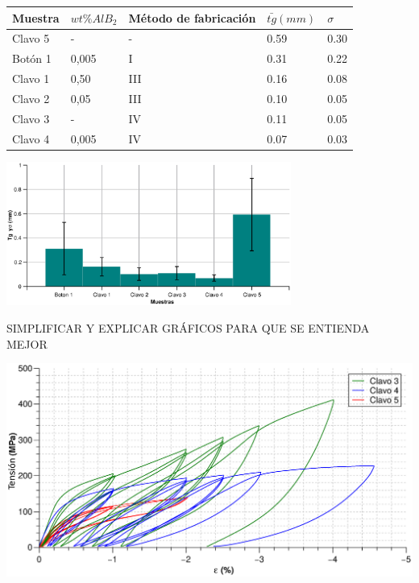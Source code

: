 \documentclass[usenames,dvipsnames]{beamer}
\begin{document}
\begin{frame}
 
 
 
\begin{table} 
\tiny
\begin{center} 
\begin{tabular}{@{}lllll@{}} \toprule
Muestra & $wt \% AlB_2$ & Método de fabricación & $\bar{tg} (mm)$ & $\sigma$ \\ \midrule
 Clavo 5 &  -     & -   & 0.59  & 0.30   \\
 Botón 1    &  0,005 & I   & 0.31 & 0.22  \\
 Clavo 1 &  0,50   & III & 0.16 & 0.08   \\
 Clavo 2 &  0,05  & III & 0.10 & 0.05   \\
 Clavo 3 &  -     & IV  & 0.11 & 0.05   \\
 Clavo 4 &  0,005 & IV  & 0.07 & 0.03   \\
\bottomrule
\end{tabular}
\end{center}
\end{table}
\begin{center}
\includegraphics[width=0.7\textwidth]{img/tamgrano/TamGranos.eps}
\end{center}

\end{frame}

\begin{frame}
SIMPLIFICAR Y EXPLICAR GRÁFICOS PARA QUE SE ENTIENDA MEJOR
 \begin{center}
\includegraphics[width=1\textwidth]{img/tamgrano/Clavos_3_4_5.eps}
\end{center}

\end{frame}
\end{document}
